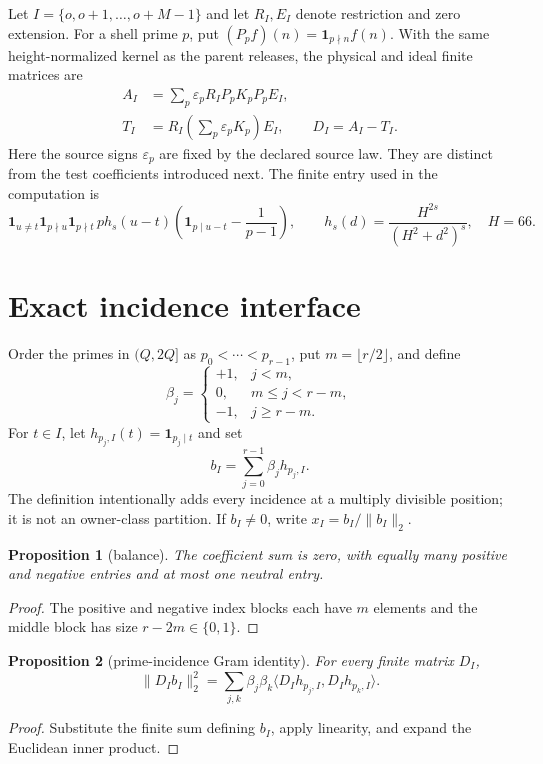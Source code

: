 \documentclass[10pt]{article}
\newtheorem{proposition}{Proposition}
\begin{document}
Let $I=\{o,o+1,\ldots,o+M-1\}$ and let $R_I,E_I$ denote restriction and zero
extension.  For a shell prime $p$, put $(P_pf)(n)=\mathbf 1_{p\nmid n}f(n)$.
With the same height-normalized kernel as the parent releases, the physical
and ideal finite matrices are
\begin{align*}
 A_I&=\sum_p\varepsilon_p R_IP_pK_pP_pE_I,\\
 T_I&=R_I\left(\sum_p\varepsilon_pK_p\right)E_I,
 \qquad D_I=A_I-T_I.
\end{align*}
Here the source signs $\varepsilon_p$ are fixed by the declared source law.
They are distinct from the test coefficients introduced next.  The finite
entry used in the computation is
\[
 \mathbf 1_{u\ne t}\mathbf 1_{p\nmid u}\mathbf 1_{p\nmid t}\,p h_s(u-t)
 \left(\mathbf 1_{p\mid u-t}-\frac1{p-1}\right),
 \qquad
 h_s(d)=\frac{H^{2s}}{(H^2+d^2)^s},\quad H=66.
\]

\section{Exact incidence interface}

Order the primes in $(Q,2Q]$ as $p_0<\cdots<p_{r-1}$, put
$m=\lfloor r/2\rfloor$, and define
\[
 \beta_j=\begin{cases}
  +1,&j<m,\\
  0,&m\le j<r-m,\\
  -1,&j\ge r-m.
 \end{cases}
\]
For $t\in I$, let $h_{p_j,I}(t)=\mathbf 1_{p_j\mid t}$ and set
\[
 b_I=\sum_{j=0}^{r-1}\beta_jh_{p_j,I}.
\]
The definition intentionally adds every incidence at a multiply divisible
position; it is not an owner-class partition.  If $b_I\ne0$, write
$x_I=b_I/\|b_I\|_2$.

\begin{proposition}[balance]
The coefficient sum is zero, with equally many positive and negative entries
and at most one neutral entry.
\end{proposition}
\begin{proof}
The positive and negative index blocks each have $m$ elements and the middle
block has size $r-2m\in\{0,1\}$.
\end{proof}

\begin{proposition}[prime-incidence Gram identity]
For every finite matrix $D_I$,
\begin{equation}
 \|D_Ib_I\|_2^2=\sum_{j,k}\beta_j\beta_k
 \langle D_Ih_{p_j,I},D_Ih_{p_k,I}\rangle.
 \label{eq:gram}
\end{equation}
\end{proposition}
\begin{proof}
Substitute the finite sum defining $b_I$, apply linearity, and expand the
Euclidean inner product.
\end{proof}
\end{document}

